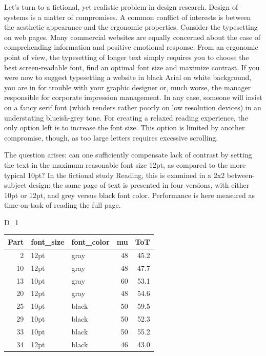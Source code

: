 \documentclass[]{svmono}
\newenvironment{Shaded}{\begin{snugshade}}{\end{snugshade}}
\newcommand{\KeywordTok}[1]{\textcolor[rgb]{0.13,0.29,0.53}{\textbf{#1}}}
\newcommand{\DataTypeTok}[1]{\textcolor[rgb]{0.13,0.29,0.53}{#1}}
\newcommand{\DecValTok}[1]{\textcolor[rgb]{0.00,0.00,0.81}{#1}}
\newcommand{\StringTok}[1]{\textcolor[rgb]{0.31,0.60,0.02}{#1}}
\newcommand{\OperatorTok}[1]{\textcolor[rgb]{0.81,0.36,0.00}{\textbf{#1}}}
\newcommand{\NormalTok}[1]{#1}
\theoremstyle{definition}
\theoremstyle{definition}
\theoremstyle{definition}
\theoremstyle{remark}
\begin{document}
Let's turn to a fictional, yet realistic problem in design research.
Design of systems is a matter of compromises. A common conflict of
interests is between the aesthetic appearance and the ergonomic
properties. Consider the typesetting on web pages. Many commercial
websites are equally concerned about the ease of comprehending
information and positive emotional response. From an ergonomic point of
view, the typesetting of longer text simply requires you to choose the
best screen-readable font, find an optimal font size and maximize
contrast. If you were now to suggest typesetting a website in black
Arial on white background, you are in for trouble with your graphic
designer or, much worse, the manager responsible for corporate
impression management. In any case, someone will insist on a fancy serif
font (which renders rather poorly on low resolution devices) in an
understating blueish-grey tone. For creating a relaxed reading
experience, the only option left is to increase the font size. This
option is limited by another compromise, though, as too large letters
requires excessive scrolling.

The question arises: can one sufficiently compensate lack of contrast by
setting the text in the maximum reasonable font size 12pt, as compared
to the more typical 10pt? In the fictional study Reading, this is
examined in a 2x2 between-subject design: the same page of text is
presented in four versions, with either 10pt or 12pt, and grey versus
black font color. Performance is here measured as time-on-task of
reading the full page.

\begin{Shaded}
\begin{Highlighting}[]
\NormalTok{D_}\DecValTok{1}
\end{Highlighting}
\end{Shaded}

\begin{longtable}[]{@{}rllrr@{}}
\toprule
Part & font\_size & font\_color & mu & ToT\tabularnewline
\midrule
\endhead
2 & 12pt & gray & 48 & 45.2\tabularnewline
10 & 12pt & gray & 48 & 47.7\tabularnewline
13 & 10pt & gray & 60 & 53.1\tabularnewline
20 & 12pt & gray & 48 & 54.6\tabularnewline
25 & 10pt & black & 50 & 59.5\tabularnewline
29 & 10pt & black & 50 & 52.3\tabularnewline
33 & 10pt & black & 50 & 55.2\tabularnewline
34 & 12pt & black & 46 & 43.0\tabularnewline
\bottomrule
\end{longtable}

\begin{Shaded}
\end{Shaded}
\end{document}
